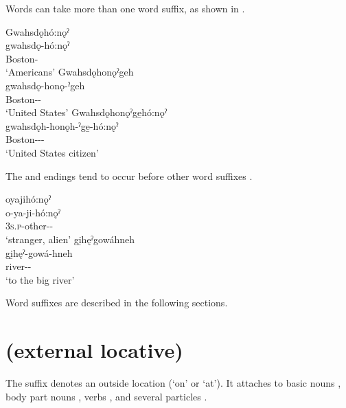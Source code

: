 Words can take more than one word suffix, as shown in .

\ea\label{ex:wdsuforder2}
\ea Gwahsdǫhó:nǫˀ\\
\gll gwahsdǫ-hó:nǫˀ\\
 Boston-{\populative}\footnotemark{}\\
\glt `Americans'
\ex Gwahsdǫhonǫˀgeh\\
\gll gwahsdǫ-honǫ-ˀgeh\\
 Boston-{\populative}-{\on}\\
\glt `United States'
\ex Gwahsdǫhonǫˀge̱hó:nǫˀ\\
\gll gwahsdǫh-honǫh-ˀge̱-hó:nǫˀ\\
 Boston-{\populative}-{\on}-{\populative}\\
\glt `United States citizen'
\z
\z

The  {\intensifier} and  {\augmentative} endings tend to occur before other word suffixes .

\ea\label{ex:wdsuforder1}
\ea oyajihó:nǫˀ\\
\gll o-ya-ji-hó:nǫˀ\\
 \textsc{3s.p}-other-{\intensifier}-\exsc{\populative}\\
\glt `stranger, alien'
\ex gi̱hęˀgowáhneh\\
\gll gi̱hęˀ-gowá-hneh\\
 river-{\augmentative}-\\
\glt `to the big river'
\z
\z

Word suffixes are described in the following sections.


\section{ {\on} (external locative)} \label{-ˀgeh}
The  {\on} suffix denotes an outside location (‘on’ or ‘at’). It attaches to basic nouns , body part nouns , verbs , and several particles .

